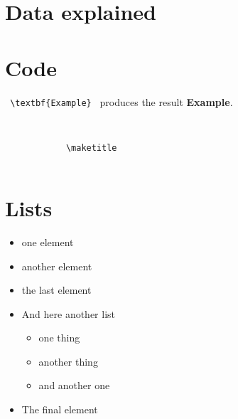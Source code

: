 \begin{appendices}

    \section{Data explained}
    
    \lipsum[3-4]

    \section{Code}
    
    \verb+ \textbf{Example} + produces the result \textbf{Example}.
    
    \begin{verbatim}

        
            \maketitle
        

    \end{verbatim}

\section{Lists}

\begin{itemize}[label={+)}]
    \item one element
    \item another element
    \item the last element
    \item And here another list
    \begin{itemize}[label={$\ast$}]
        \item one thing
        \item another thing
        \item and another one
    \end{itemize}
    \item The final element
\end{itemize}

\clearpage


\end{appendices}
